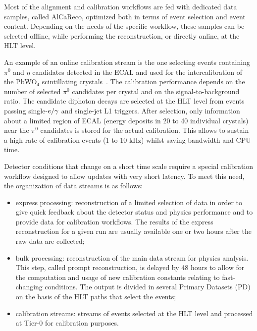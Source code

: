 Most of the alignment and calibration workflows are fed with dedicated
data samples, called AlCaReco, optimized both in terms of event
selection and event content. Depending on the needs of the specific
workflow, these samples can be selected offline, while performing the
reconstruction, or directly online, at the HLT level. 

An example of an online calibration stream is the one selecting events
containing $\pi^0$ and $\eta$ candidates detected in the ECAL and used
for the intercalibration of the PbWO$_4$ scintillating
crystals~\cite{Chatrchyan:2013dga}. The calibration performance
depends on the number of selected $\pi^0$ candidates per crystal and
on the signal-to-background ratio. The candidate diphoton decays are
selected at the HLT level from events passing single-$e/\gamma$ and
single-jet L1 triggers. After selection, only information about a
limited region of ECAL (energy deposits in 20 to 40 individual
crystals) near the $\pi^0$ candidates is stored for the actual
calibration. This allows to sustain a high rate of calibration events
(1 to 10 kHz) whilst saving bandwidth and CPU time.


Detector conditions that change on a short time scale require a special
calibration workflow designed to allow updates with very short
latency. To meet this need, the organization of data streams is as follows:
\begin{itemize}
\item express processing: reconstruction of a limited selection of
  data in order to give quick feedback about the detector status and
  physics performance and to provide data for calibration
  workflows. The results of the express reconstruction for a given run
  are usually available one or two hours after the raw data are
  collected;
\item bulk processing: reconstruction of the main data stream for
  physics analysis. This step, called prompt reconstruction, is
  delayed by 48 hours to allow for the computation and usage of 
  new calibration constants relating to fast-changing conditions. The output is divided in
  several Primary Datasets (PD) on the basis of the HLT paths that select the events;
\item calibration streams: streams of events selected at the HLT level
  and processed at Tier-0 for calibration purposes.
\end{itemize}

